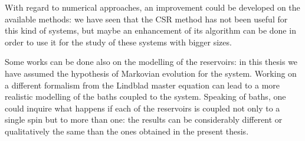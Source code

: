 With regard to numerical approaches, an improvement could be developed on the available methods: we have seen that the CSR method has not been useful for this kind of systems, but maybe an enhancement of its algorithm can be done in order to use it for the study of these systems with bigger sizes.

Some works can be done also on the modelling of the reservoirs:  in this thesis we have assumed the hypothesis of Markovian evolution for the system. Working on a different formalism from the Lindblad master equation can lead to a more realistic modelling of the baths coupled to the system. Speaking of baths, one could inquire what happens if each of the reservoirs is coupled not only to a single spin but to more than one: the results can be considerably different or qualitatively the same than the ones obtained in the present thesis.

